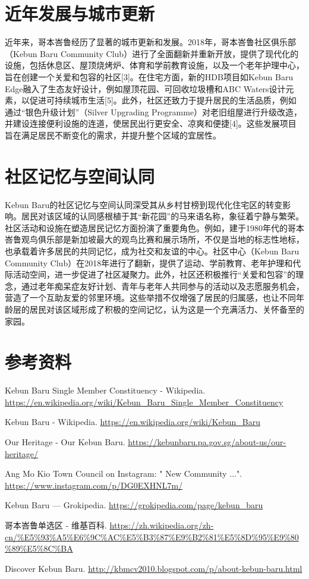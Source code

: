 \documentclass[11pt,a4paper,twoside,openany]{book}
\begin{document}
\section{近年发展与城市更新}
近年来，哥本峇鲁经历了显著的城市更新和发展。2018年，哥本峇鲁社区俱乐部（Kebun Baru Community Club）进行了全面翻新并重新开放，提供了现代化的设施，包括休息区、屋顶烧烤炉、体育和学前教育设施，以及一个老年护理中心，旨在创建一个关爱和包容的社区[3]。在住宅方面，新的HDB项目如Kebun Baru Edge融入了生态友好设计，例如屋顶花园、可回收垃圾槽和ABC Waters设计元素，以促进可持续城市生活[5]。此外，社区还致力于提升居民的生活品质，例如通过“银色升级计划”（Silver Upgrading Programme）对老旧组屋进行升级改造，并建设连接便利设施的连道，使居民出行更安全、凉爽和便捷[4]。这些发展项目旨在满足居民不断变化的需求，并提升整个区域的宜居性。

\section{社区记忆与空间认同}
Kebun Baru的社区记忆与空间认同深受其从乡村甘榜到现代化住宅区的转变影响。居民对该区域的认同感根植于其“新花园”的马来语名称，象征着宁静与繁荣。社区活动和设施在塑造居民记忆方面扮演了重要角色。例如，建于1980年代的哥本峇鲁观鸟俱乐部是新加坡最大的观鸟比赛和展示场所，不仅是当地的标志性地标，也承载着许多居民的共同记忆，成为社交和友谊的中心。社区中心（Kebun Baru Community Club）在2018年进行了翻新，提供了运动、学前教育、老年护理和代际活动空间，进一步促进了社区凝聚力。此外，社区还积极推行“关爱和包容”的理念，通过老年痴呆症友好计划、青年与老年人共同参与的活动以及志愿服务机会，营造了一个互助友爱的邻里环境。这些举措不仅增强了居民的归属感，也让不同年龄层的居民对该区域形成了积极的空间记忆，认为这是一个充满活力、关怀备至的家园。

\section*{参考资料}
\begin{enumerate}[label={[\arabic*]},leftmargin=*,topsep=2pt,itemsep=1pt,parsep=0pt]
  \item Kebun Baru Single Member Constituency - Wikipedia. \url{https://en.wikipedia.org/wiki/Kebun_Baru_Single_Member_Constituency}
  \item Kebun Baru - Wikipedia. \url{https://en.wikipedia.org/wiki/Kebun_Baru}
  \item Our Heritage - Our Kebun Baru. \url{https://kebunbaru.pa.gov.sg/about-us/our-heritage/}
  \item Ang Mo Kio Town Council on Instagram: "   New Community ...". \url{https://www.instagram.com/p/DG0EXHNL7m/}
  \item Kebun Baru — Grokipedia. \url{https://grokipedia.com/page/kebun_baru}
  \item 哥本峇鲁单选区 - 维基百科. \url{https://zh.wikipedia.org/zh-cn/%E5%93%A5%E6%9C%AC%E5%B3%87%E9%B2%81%E5%8D%95%E9%80%89%E5%8C%BA}
  \item Discover Kebun Baru. \url{http://kbmcv2010.blogspot.com/p/about-kebun-baru.html}
\end{enumerate}
\end{document}
